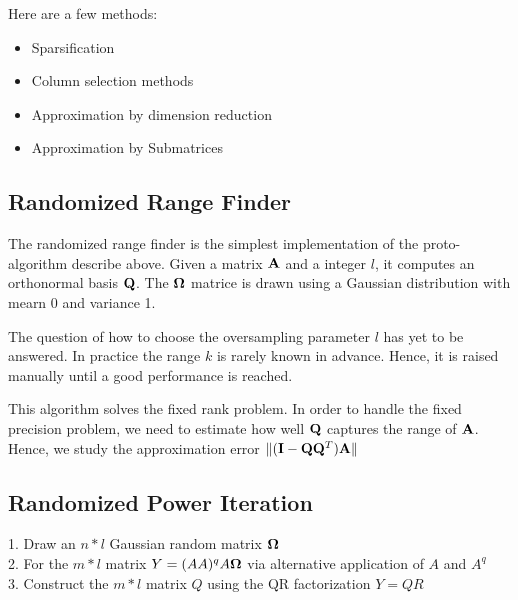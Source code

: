 \documentclass[onecolumn,12pt]{article}
\begin{document}
Here are a few methods:

\begin{itemize}
\item Sparsification
\item Column selection methods
\item Approximation by dimension reduction
\item Approximation by Submatrices
\end{itemize}

\subsection{Randomized Range Finder}

The randomized range finder is the simplest implementation of the
proto-algorithm describe above. Given a matrix $\bold{A}$ and a integer $l$,
it computes an orthonormal basis $\bold{Q}$. The $\bold{\Omega}$ matrice is
drawn using a Gaussian distribution with mearn 0 and variance 1.

\noindent{}

The question of how to choose the oversampling parameter $l$ has yet to be
answered. In practice the range $k$ is rarely known in advance. Hence, it is
raised manually until a good performance is reached.

This algorithm solves the fixed rank problem. In order to handle the fixed
precision problem, we need to estimate how well $\bold{Q}$ captures the range
of $\bold{A}$. Hence, we study the approximation error 
$\lVert (\bold{I} - \bold{Q} \bold{Q}^T) \bold{A} \lVert$

\subsection{Randomized Power Iteration}

1. Draw an $n * l$ Gaussian random matrix $\bold{\Omega}$ \\
2. For the $m * l$ matrix $Y = (AA)^qA\bold{\Omega}$ via alternative application of
$A$ and $A^q$ \\
3. Construct the $m * l$ matrix $Q$ using the QR factorization $Y = QR$
\end{document}
